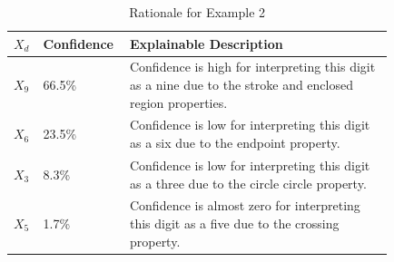 \documentclass[conference]{IEEEtran}
\begin{document}
\begin{table}[htbp]
\caption{Probabilistic voting, effectiveness, and explainability for Example 2}
\centering
{}
\label{table:example2}
\end{table}

\begin{table}[htbp]
\caption{Rationale for Example 2}
\centering
\begin{tabular}{| p{0.04\linewidth} | p{0.14\linewidth} | p{0.65\linewidth} |}
\hline
 $X_d$ & Confidence & Explainable Description \\
\hline \cline{1-3}
$X_9$ & 66.5\% & Confidence is high for interpreting this digit as a nine due to the stroke and enclosed region properties. \\
\hline
$X_6$ & 23.5\% & Confidence is low for interpreting this digit as a six due to the endpoint property.  \\
\hline
$X_3$ & 8.3\% & Confidence is low for interpreting this digit as a three due to the circle circle property.  \\ 
\hline
$X_5$ & 1.7\% & Confidence is almost zero for interpreting this digit as a five due to the crossing property. \\
\hline
\end{tabular}
\label{table:exexample2}
\end{table}
\end{document}
